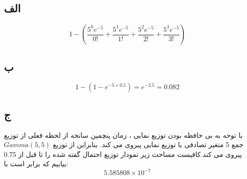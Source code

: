

\subsection*{الف}
		$$ 1 - \left ( \frac{5 ^ 0 e ^ {-5}}{0!} + \frac{5 ^ 1 e ^ {-5}}{1!} + \frac{5 ^ 2 e ^ {-5}}{2!} + \frac{5 ^ 3 e ^ {-5}}{3!}\right ) $$
\subsection*{ب}
		$$ 1 - (1 - e ^ {-5 \times 0.5}) = e ^ {-2.5} = 0.082$$
\subsection*{ج}
با توحه به بی حافظه بودن توزیع نمایی ، زمان پنچمین سانحه از لحظه فعلی از توزیع جمع 5 متغیر تصادفی با توزیع نمایی پیروی می کند. بنابراین  از توزیع $Gamma(5 , 5)$ پیروی می کند.کافیست مساحت زیر نمودار توزیع احتمال گفته شده را تا قبل از 0.75 بیابیم که برابر است با:
$$ 5.585808 \times 10 ^ {-7}$$ 


